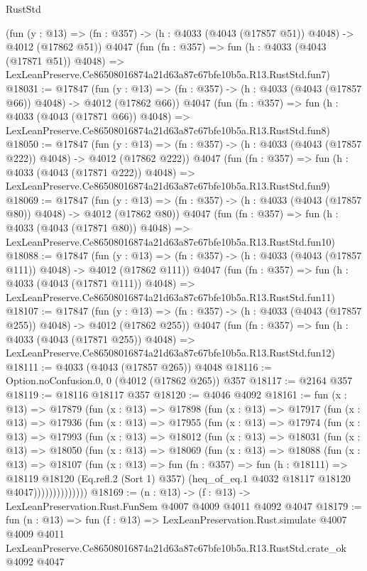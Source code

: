 \begin{lexlean}{RustStd}
\begin{coremodule}
    (fun (y : @13) => (fn : @357) -> (h : @4033 (@4043 (@17857 @51)) @4048) -> @4012 (@17862 @51))
    @4047
    (fun (fn : @357) =>
    fun (h : @4033 (@4043 (@17871 @51)) @4048) =>
    LexLeanPreserve.Ce86508016874a21d63a87c67bfe10b5a.R13.RustStd.fun7)
@18031 := @17847
    (fun (y : @13) => (fn : @357) -> (h : @4033 (@4043 (@17857 @66)) @4048) -> @4012 (@17862 @66))
    @4047
    (fun (fn : @357) =>
    fun (h : @4033 (@4043 (@17871 @66)) @4048) =>
    LexLeanPreserve.Ce86508016874a21d63a87c67bfe10b5a.R13.RustStd.fun8)
@18050 := @17847
    (fun (y : @13) => (fn : @357) -> (h : @4033 (@4043 (@17857 @222)) @4048) -> @4012 (@17862 @222))
    @4047
    (fun (fn : @357) =>
    fun (h : @4033 (@4043 (@17871 @222)) @4048) =>
    LexLeanPreserve.Ce86508016874a21d63a87c67bfe10b5a.R13.RustStd.fun9)
@18069 := @17847
    (fun (y : @13) => (fn : @357) -> (h : @4033 (@4043 (@17857 @80)) @4048) -> @4012 (@17862 @80))
    @4047
    (fun (fn : @357) =>
    fun (h : @4033 (@4043 (@17871 @80)) @4048) =>
    LexLeanPreserve.Ce86508016874a21d63a87c67bfe10b5a.R13.RustStd.fun10)
@18088 := @17847
    (fun (y : @13) => (fn : @357) -> (h : @4033 (@4043 (@17857 @111)) @4048) -> @4012 (@17862 @111))
    @4047
    (fun (fn : @357) =>
    fun (h : @4033 (@4043 (@17871 @111)) @4048) =>
    LexLeanPreserve.Ce86508016874a21d63a87c67bfe10b5a.R13.RustStd.fun11)
@18107 := @17847
    (fun (y : @13) => (fn : @357) -> (h : @4033 (@4043 (@17857 @255)) @4048) -> @4012 (@17862 @255))
    @4047
    (fun (fn : @357) =>
    fun (h : @4033 (@4043 (@17871 @255)) @4048) =>
    LexLeanPreserve.Ce86508016874a21d63a87c67bfe10b5a.R13.RustStd.fun12)
@18111 := @4033 (@4043 (@17857 @265)) @4048
@18116 := Option.noConfusion.{0, 0} (@4012 (@17862 @265)) @357
@18117 := @2164 @357
@18119 := @18116 @18117 @357
@18120 := @4046 @4092
@18161 := fun (x : @13) =>
  @17879
    (fun (x : @13) =>
    @17898
      (fun (x : @13) =>
      @17917
        (fun (x : @13) =>
        @17936
          (fun (x : @13) =>
          @17955
            (fun (x : @13) =>
            @17974
              (fun (x : @13) =>
              @17993
                (fun (x : @13) =>
                @18012
                  (fun (x : @13) =>
                  @18031
                    (fun (x : @13) =>
                    @18050
                      (fun (x : @13) =>
                      @18069
                        (fun (x : @13) =>
                        @18088
                          (fun (x : @13) =>
                          @18107
                            (fun (x : @13) =>
                            fun (fn : @357) =>
                            fun (h : @18111) =>
                            @18119
                              @18120
                              (Eq.refl.{2} (Sort 1) @357)
                              (heq_of_eq.{1} @4032 @18117 @18120 @4047))))))))))))))
@18169 := (n : @13) -> (f : @13) -> LexLeanPreservation.Rust.FunSem @4007 @4009 @4011 @4092 @4047
@18179 := fun (n : @13) =>
  fun (f : @13) =>
  LexLeanPreservation.Rust.simulate
    @4007
    @4009
    @4011
    LexLeanPreserve.Ce86508016874a21d63a87c67bfe10b5a.R13.RustStd.crate_ok
    @4092
    @4047
\end{coremodule}
\end{lexlean}
